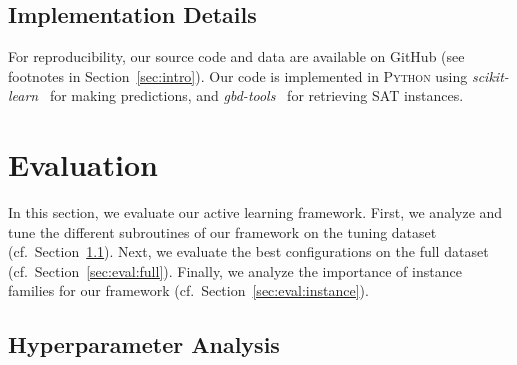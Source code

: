 \documentclass[sn-basic, Numbered]{sn-jnl} %
\begin{document}
\subsection{Implementation Details}
\label{sec:exdesign:impl}

For reproducibility, our source code and data are available on GitHub (see footnotes in Section~\ref{sec:intro}).
Our code is implemented in \textsc{Python} using \emph{scikit-learn}~\cite{scikit-learn} for making predictions, and \emph{gbd-tools}~\cite{GBD24paper} for retrieving SAT instances.


\section{Evaluation}
\label{sec:eval}

In this section, we evaluate our active learning framework.
First, we analyze and tune the different subroutines of our framework on the tuning dataset (cf.~Section~\ref{sec:eval:hyper}).
Next, we evaluate the best configurations on the full dataset (cf.~Section~\ref{sec:eval:full}).
Finally, we analyze the importance of instance families for our framework (cf.~Section~\ref{sec:eval:instance}).

\subsection{Hyperparameter Analysis}
\label{sec:eval:hyper}
\end{document}
